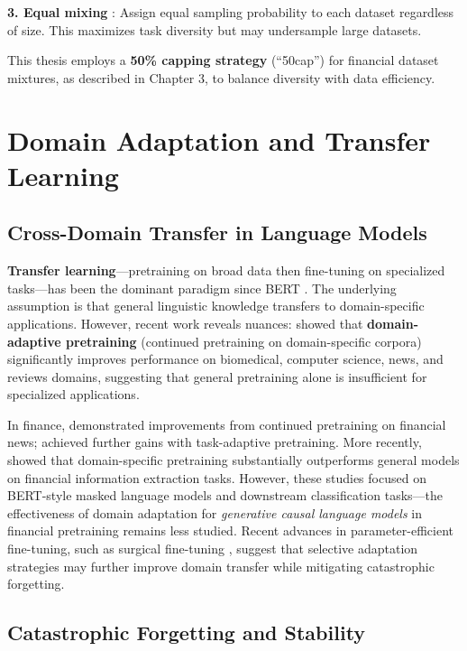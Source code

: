 \textbf{3. Equal mixing} \parencite{sanh2022multitask}: Assign equal sampling probability to each dataset regardless of size. This maximizes task diversity but may undersample large datasets.

This thesis employs a \textbf{50\% capping strategy} (``50cap'') for financial dataset mixtures, as described in Chapter 3, to balance diversity with data efficiency.

\section{Domain Adaptation and Transfer Learning}

\subsection{Cross-Domain Transfer in Language Models}

\textbf{Transfer learning}---pretraining on broad data then fine-tuning on specialized tasks---has been the dominant paradigm since BERT \parencite{devlin2019bert,pan2010transfer,zhuang2020comprehensive}. The underlying assumption is that general linguistic knowledge transfers to domain-specific applications. However, recent work reveals nuances: \textcite{gururangan2020don} showed that \textbf{domain-adaptive pretraining} (continued pretraining on domain-specific corpora) significantly improves performance on biomedical, computer science, news, and reviews domains, suggesting that general pretraining alone is insufficient for specialized applications.

In finance, \textcite{araci2019finbert} demonstrated improvements from continued pretraining on financial news; \textcite{yang2020finbert} achieved further gains with task-adaptive pretraining. More recently, \textcite{huang2023finbert} showed that domain-specific pretraining substantially outperforms general models on financial information extraction tasks. However, these studies focused on BERT-style masked language models and downstream classification tasks---the effectiveness of domain adaptation for \textit{generative causal language models} in financial pretraining remains less studied. Recent advances in parameter-efficient fine-tuning, such as surgical fine-tuning \parencite{lee2022surgical}, suggest that selective adaptation strategies may further improve domain transfer while mitigating catastrophic forgetting.

\subsection{Catastrophic Forgetting and Stability}

